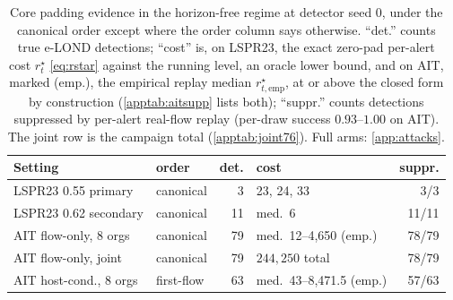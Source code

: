 \documentclass[conference]{IEEEtran}
\begin{document}
\begin{table}[t]
\centering
\caption{Core padding evidence in the horizon-free regime at detector seed 0, under the canonical
order except where the order column says otherwise. ``det.'' counts true e-LOND detections; ``cost'' is, on LSPR23, the exact zero-pad per-alert cost
$r^{\star}_t$ \eqref{eq:rstar} against the running level, an oracle lower bound, and on AIT, marked
(emp.), the empirical replay median $r^{\star}_{t,\mathrm{emp}}$, at or above the closed form by
construction (\cref{apptab:aitsupp} lists both); ``suppr.'' counts detections suppressed by per-alert real-flow replay (per-draw success $0.93$--$1.00$
on AIT). The joint row is the campaign total (\cref{apptab:joint76}). Full arms: \cref{app:attacks}.}
\label{tab:main}
\footnotesize
\setlength{\tabcolsep}{3pt}
\begin{tabular}{@{}llrlr@{}}
\toprule
Setting & order & det. & cost & suppr. \\
\midrule
LSPR23 0.55 primary & canonical & 3 & 23, 24, 33 & 3/3 \\
LSPR23 0.62 secondary & canonical & 11 & med.\ 6 & 11/11 \\
AIT flow-only, 8 orgs & canonical & 79 & med.\ 12--4{,}650 (emp.) & 78/79 \\
AIT flow-only, joint & canonical & 79 & $244{,}250$ total & 78/79 \\
AIT host-cond., 8 orgs & first-flow & 63 & med.\ 43--8{,}471.5 (emp.) & 57/63 \\
\bottomrule
\end{tabular}
\end{table}
\end{document}
